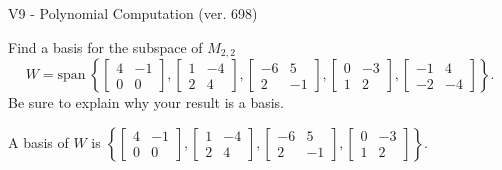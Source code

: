 \begin{exercise}
  \begin{exerciseTitle}V9 - Polynomial Computation (ver. 698)\end{exerciseTitle}
  \begin{exerciseStatement}
    Find a basis for the subspace of \(M_{2,2}\) 
\[W=\mathrm{span}\ \left\{\left[\begin{array}{cc}
4 & -1 \\
0 & 0
\end{array}\right] , \left[\begin{array}{cc}
1 & -4 \\
2 & 4
\end{array}\right] , \left[\begin{array}{cc}
-6 & 5 \\
2 & -1
\end{array}\right] , \left[\begin{array}{cc}
0 & -3 \\
1 & 2
\end{array}\right] , \left[\begin{array}{cc}
-1 & 4 \\
-2 & -4
\end{array}\right]\right\}.\]
 Be sure to explain why your result is a basis.


  \end{exerciseStatement}
  \begin{exerciseAnswer}
   A basis of \(W\) is  \(\left\{\left[\begin{array}{cc}
4 & -1 \\
0 & 0
\end{array}\right] , \left[\begin{array}{cc}
1 & -4 \\
2 & 4
\end{array}\right] , \left[\begin{array}{cc}
-6 & 5 \\
2 & -1
\end{array}\right] , \left[\begin{array}{cc}
0 & -3 \\
1 & 2
\end{array}\right]\right\}\).
  


  \end{exerciseAnswer}
\end{exercise}